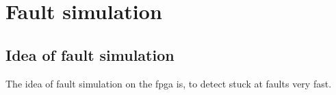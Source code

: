 \section{Fault simulation}
\subsection{Idea of fault simulation}
The idea of fault simulation on the fpga is, to detect stuck at faults very fast.